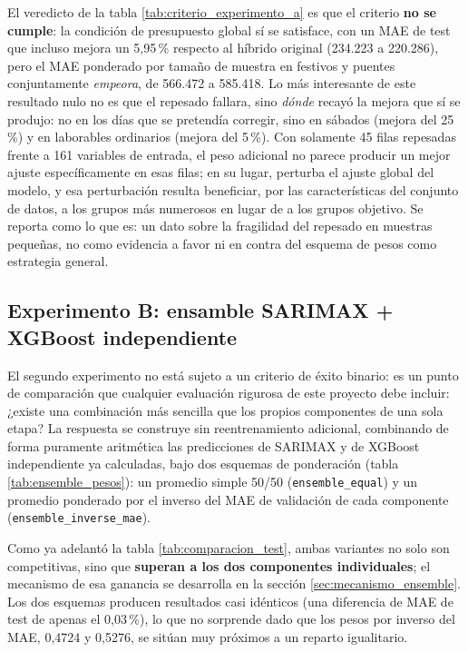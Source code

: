 El veredicto de la tabla \ref{tab:criterio_experimento_a} es que el criterio \textbf{no se
cumple}: la condición de presupuesto global sí se satisface, con un MAE de test que
incluso mejora un 5,95\,\% respecto al híbrido original (234.223 a 220.286), pero el MAE
ponderado por tamaño de muestra en festivos y puentes conjuntamente \emph{empeora}, de
566.472 a 585.418. Lo más interesante de este resultado nulo no es que el repesado fallara, sino
\emph{dónde} recayó la mejora que sí se produjo: no en los días que se pretendía
corregir, sino en sábados (mejora del 25\,\%) y en laborables ordinarios (mejora del
5\,\%). Con solamente 45 filas repesadas frente a 161 variables de entrada, el peso
adicional no parece producir un mejor ajuste específicamente en esas filas; en su lugar,
perturba el ajuste global del modelo, y esa perturbación resulta beneficiar, por las
características del conjunto de datos, a los grupos más numerosos en lugar de a los
grupos objetivo. Se reporta como lo que es: un dato sobre la fragilidad del repesado en
muestras pequeñas, no como evidencia a favor ni en contra del esquema de pesos como
estrategia general.

\subsection{Experimento B: ensamble SARIMAX + XGBoost independiente}\label{sec:por_que_ensemble}

El segundo experimento no está sujeto a un criterio de éxito binario: es un punto de
comparación que cualquier evaluación rigurosa de este proyecto debe incluir: ¿existe una
combinación más sencilla que los propios componentes de una sola etapa? La respuesta se
construye sin reentrenamiento adicional, combinando de forma puramente aritmética las
predicciones de SARIMAX y de XGBoost independiente ya calculadas, bajo dos esquemas de
ponderación (tabla \ref{tab:ensemble_pesos}):
un promedio simple 50/50 (\texttt{ensemble\_equal}) y un promedio ponderado por el inverso
del MAE de validación de cada componente (\texttt{ensemble\_inverse\_mae}).

\begin{table}[htbp]
  \centering
  
  \caption{}
  \label{tab:ensemble_pesos}
\end{table}

Como ya adelantó la tabla \ref{tab:comparacion_test}, ambas variantes no solo son
competitivas, sino que \textbf{superan a los dos componentes individuales}; el mecanismo
de esa ganancia se desarrolla en la sección \ref{sec:mecanismo_ensemble}. Los dos esquemas
producen resultados casi idénticos (una diferencia de MAE de test de apenas el 0,03\,\%),
lo que no sorprende dado que los pesos por inverso del MAE, 0,4724 y 0,5276, se sitúan muy
próximos a un reparto igualitario.

